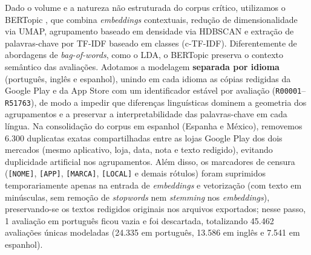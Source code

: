 Dado o volume e a natureza não estruturada do corpus crítico, utilizamos o BERTopic \parencite{grootendorst2022,egger2022}, que combina \textit{embeddings} contextuais, redução de dimensionalidade via UMAP, agrupamento baseado em densidade via HDBSCAN e extração de palavras-chave por TF-IDF baseado em classes (c-TF-IDF). Diferentemente de abordagens de \textit{bag-of-words}, como o LDA, o BERTopic preserva o contexto semântico das avaliações. Adotamos a modelagem \textbf{separada por idioma} (português, inglês e espanhol), unindo em cada idioma as cópias redigidas da Google Play e da App Store com um identificador estável por avaliação (\texttt{R00001}--\texttt{R51763}), de modo a impedir que diferenças linguísticas dominem a geometria dos agrupamentos e a preservar a interpretabilidade das palavras-chave em cada língua. Na consolidação do corpus em espanhol (Espanha e México), removemos 6.300 duplicatas exatas compartilhadas entre as lojas Google Play dos dois mercados (mesmo aplicativo, loja, data, nota e texto redigido), evitando duplicidade artificial nos agrupamentos. Além disso, os marcadores de censura (\texttt{[NOME]}, \texttt{[APP]}, \texttt{[MARCA]}, \texttt{[LOCAL]} e demais rótulos) foram suprimidos temporariamente apenas na entrada de \textit{embeddings} e vetorização (com texto em minúsculas, sem remoção de \textit{stopwords} nem \textit{stemming} nos \textit{embeddings}), preservando-se os textos redigidos originais nos arquivos exportados; nesse passo, 1 avaliação em português ficou vazia e foi descartada, totalizando 45.462 avaliações únicas modeladas (24.335 em português, 13.586 em inglês e 7.541 em espanhol).

